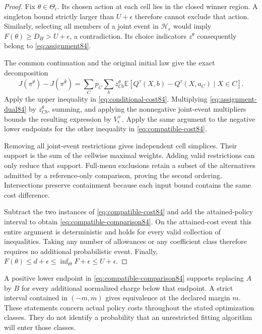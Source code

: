 \begin{proof}
Fix $\theta\in\Theta_\epsilon$. Its chosen action at each cell lies in the closed winner region. A singleton bound strictly larger than $U+\epsilon$ therefore cannot exclude that action. Similarly, selecting all members of a joint event in $\mathcal H_\epsilon$ would imply $F(\theta)\ge D_H>U+\epsilon$, a contradiction. Its choice indicators $z^\theta$ consequently belong to \eqref{eq:assignment84}.

The common continuation and the original initial law give the exact decomposition
\[
 J(\pi^\theta)-J(\pi^{\widehat\theta})
 =\sum_Cp_C\sum_bz^\theta_{Cb}
   \mathbb E[Q^\tau(X,b)-Q^\tau(X,a_C)\mid X\in C].
\]
Apply the upper inequality in \eqref{eq:conditional-cost84}. Multiplying \eqref{eq:assignment-dual84} by $z^\theta_{Cb}$, summing, and applying the nonnegative joint-event multipliers bounds the resulting expression by $V_\epsilon^+$. Apply the same argument to the negative lower endpoints for the other inequality in \eqref{eq:compatible-cost84}.

Removing all joint-event restrictions gives independent cell simplices. Their support is the sum of the cellwise maximal weights. Adding valid restrictions can only reduce that support. Full-menu exclusions retain a subset of the alternatives admitted by a reference-only comparison, proving the second ordering. Intersections preserve containment because each input bound contains the same cost difference.

Subtract the two instances of \eqref{eq:compatible-cost84} and add the attained-policy interval to obtain \eqref{eq:compatible-comparison84}. On the attained-cost event this entire argument is deterministic and holds for every valid collection of inequalities. Taking any number of allowances or any coefficient class therefore requires no additional probabilistic event. Finally,
$F(\theta)\le d+\epsilon\le\inf_\Theta F+\epsilon\le U+\epsilon$.
\end{proof}

A positive lower endpoint in \eqref{eq:compatible-comparison84} supports replacing $A$ by $B$ for every additional normalized charge below that endpoint. A strict interval contained in $(-m,m)$ gives equivalence at the declared margin $m$. These statements concern actual policy costs throughout the stated optimization classes. They do not identify a probability that an unrestricted fitting algorithm will enter those classes.

